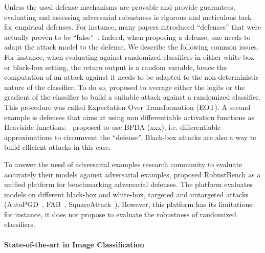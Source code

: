 Unless the used defense mechanisms are provable and provide guarantees, evaluating and assessing adversarial robustness is rigorous and meticulous task for empirical defenses. For instance, many papers introduced ``defenses'' that were actually proven to be ``false''~\citep{athalye2018obfuscated,carlini2019evaluating}. Indeed, when proposing a defense, one needs to adapt the attack model to the defense. We describe the following common issues. For instance, when evaluating against randomized classifiers in either white-box or black-box setting, the return output is a random variable, hence the computation of an attack against it needs to be adapted to the non-deterministic nature of the classifier. To do so, \cite{athalye2018obfuscated} proposed to average either the logits or the gradient of the classifier to build a suitable attack against a randomized classifier. This procedure was called Expectation Over Transformation (EOT). A second example is defenses that aims at using non differentiable activation functions as Heaviside functions.~\cite{athalye2017synthesizing} proposed to use BPDA (xxx), i.e. differentiable approximations to circumvent the ``defense''. Black-box attacks are also a way to build efficient attacks in this case. 

To answer the need of adversarial examples research community to evaluate accurately their models against adversarial examples, \cite{croce2020robustbench} proposed RobustBench as a unified platform for benchmarking adversarial defenses. The platform evaluates models on different black-box and white-box, targeted and untargeted attacks (AutoPGD~\citep{croce2020reliable}, FAB~\citep{Croce2020MinimallyDA}, SquareAttack~\citep{andriushchenko2019square}). However, this platform has its limitations:  for instance, it  does not propose to evaluate the robustness of randomized classifiers. 

\paragraph{State-of-the-art in Image Classification}

